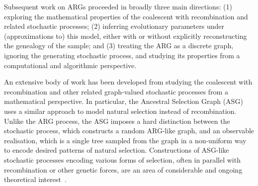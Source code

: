 \documentclass{article}
\begin{document}
Subsequent work on ARGs proceeded in broadly three main directions:
(1) exploring the mathematical properties of the coalescent with recombination and
related stochastic processes;
(2) inferring evolutionary parameters under
(approximations to) this model, either with or without explicitly reconstructing the
genealogy of the sample;
and (3) treating the ARG as a discrete graph, ignoring the
generating stochastic process, and studying its properties from a computational and
algorithmic perspective.

An extensive body of work has been developed from
studying the coalescent with recombination
and other related
graph-valued stochastic processes from a mathematical perspective.
In particular, the Ancestral Selection Graph
(ASG)~\citep{krone1997ancestral,neuhauser1997genealogy}
uses a similar approach to model natural selection instead of recombination.
Unlike the ARG process, the ASG imposes a hard distinction between the stochastic process,
which constructs a random ARG-like graph, and an observable realisation,
which is a single tree sampled from the graph in a non-uniform way to encode
desired patterns of natural selection.
Constructions of ASG-like stochastic processes encoding various
forms of selection, often in parallel with recombination or other genetic forces,
are an area of considerable and ongoing theoretical interest~\citep[e.g.][]{
neuhauser1999ancestral,
donnelly1999genealogical,
fearnhead2001perfect,
fearnhead2003ancestral,
etheridge2009coalescent,
gonzalezcasanova2018duality,
koskela2019robust}.
\end{document}
